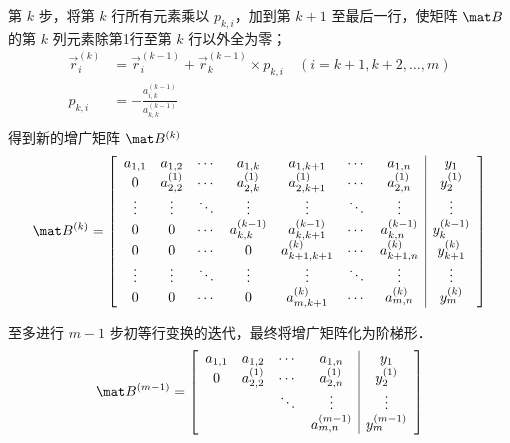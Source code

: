 第 $k$ 步，将第 $k$ 行所有元素乘以 $p_{k,i}$，加到第 $k+1$ 至最后一行，使矩阵 $\mat B$ 的第 $k$ 列元素除第1行至第 $k$ 行以外全为零；
\begin{equation}\begin{aligned}
\vec r_i^{(k)} &= \vec r_i^{(k-1)} + \vec r_k^{(k-1)} \times p_{k,i} \quad (i=k+1,k+2,\dots,m) \\
p_{k,i} &= - \frac{a_{i,k}^{(k-1)}}{a_{k,k}^{(k-1)}} \\
\end{aligned}\end{equation}
得到新的增广矩阵 $\mat B^{(k)}$
\begin{equation}
\mat B^{(k)}={
	\left[ \begin{array}{ccccccc|c}
	a_{1,1} &a_{1,2}       &\cdots &a_{1,k}         &a_{1,k+1}         &\cdots &a_{1,n}         &y_1 \\
	0       &a_{2,2}^{(1)} &\cdots &a_{2,k}^{(1)}   &a_{2,k+1}^{(1)}   &\cdots &a_{2,n}^{(1)}   &y_2^{(1)} \\
	\vdots  &\vdots        &\ddots &\vdots          &\vdots            &\ddots &\vdots          &\vdots \\
	0       &0             &\cdots &a_{k,k}^{(k-1)} &a_{k,k+1}^{(k-1)} &\cdots &a_{k,n}^{(k-1)} &y_k^{(k-1)} \\
     0       &0             &\cdots &0               &a_{k+1,k+1}^{(k)} &\cdots &a_{k+1,n}^{(k)} &y_{k+1}^{(k)} \\
     \vdots  &\vdots        &\ddots &\vdots          &\vdots            &\ddots &\vdots          &\vdots \\
     0       &0             &\cdots &0               &a_{m,k+1}^{(k)}   &\cdots &a_{m,n}^{(k)}   &y_m^{(k)} \\
	\end{array} 
	\right ]}
\end{equation}

至多进行 $m-1$ 步初等行变换的迭代，最终将增广矩阵化为阶梯形．
\begin{equation}
\mat B^{(m-1)}={
	\left[ \begin{array}{cccc|c}
	a_{1,1} &a_{1,2}       &\cdots &a_{1,n}         &y_1 \\
	0       &a_{2,2}^{(1)} &\cdots &a_{2,n}^{(1)}   &y_2^{(1)} \\
	        &              &\ddots &\vdots          &\vdots \\
	        &              &       &a_{m,n}^{(m-1)} &y_m^{(m-1)} \\
	\end{array} 
	\right ]}
\end{equation}

